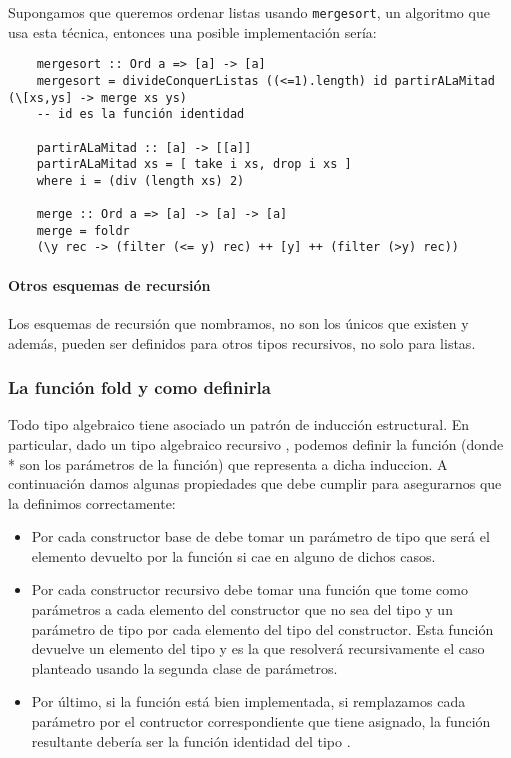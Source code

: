 Supongamos que queremos ordenar listas usando \texttt{mergesort}, un algoritmo que usa esta técnica, entonces una posible implementación sería:

\begin{centrado}
	\begin{verbatim}
	mergesort :: Ord a => [a] -> [a]
	mergesort = divideConquerListas ((<=1).length) id partirALaMitad (\[xs,ys] -> merge xs ys)	
	-- id es la función identidad

	partirALaMitad :: [a] -> [[a]]
	partirALaMitad xs = [ take i xs, drop i xs ] 
	where i = (div (length xs) 2)
	
	merge :: Ord a => [a] -> [a] -> [a]
	merge = foldr 
	(\y rec -> (filter (<= y) rec) ++ [y] ++ (filter (>y) rec))	 
	\end{verbatim}
\end{centrado}


\paragraph{Otros esquemas de recursión} Los esquemas de recursión que nombramos, no son los únicos que existen y además, pueden ser definidos para otros tipos recursivos, no solo para listas.

\subsubsection{La función fold y como definirla}
Todo tipo algebraico tiene asociado un patrón de inducción estructural. En particular, dado un tipo algebraico recursivo , podemos definir la función  (donde * son los parámetros de la función) que representa a dicha induccion. A continuación damos algunas propiedades que debe cumplir  para asegurarnos que la definimos correctamente:
\begin{itemize}
	\item Por cada constructor base de  debe tomar un parámetro de tipo  que será el elemento devuelto por la función si cae en alguno de dichos casos.
	\item Por cada constructor recursivo debe tomar una función que tome como parámetros a cada elemento del constructor que no sea del tipo  y un parámetro de tipo  por cada elemento del tipo   del constructor. Esta función devuelve un elemento del tipo  y es la que resolverá recursivamente el caso planteado usando la segunda clase de parámetros.
	\item Por último, si la función está bien implementada, si remplazamos cada parámetro por el contructor correspondiente que tiene asignado, la función resultante debería ser la función identidad del tipo .
\end{itemize}


